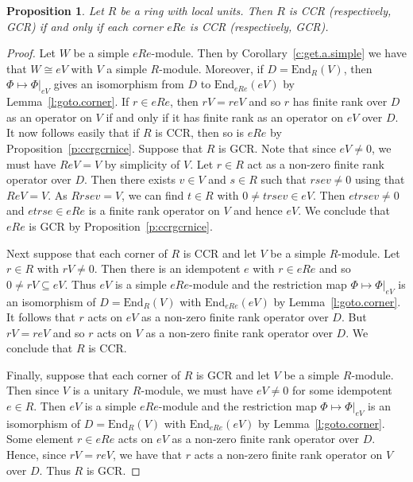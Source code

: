 \documentclass[11pt,reqno]{amsart}
\theoremstyle{plain}
\newtheorem{prop}[thm]{Proposition}
\numberwithin{equation}{section}
\begin{document}
\begin{prop}\label{p:corner.inv}
Let $R$ be a ring with local units.  Then $R$ is CCR (respectively, GCR) if and only if each corner $eRe$ is CCR (respectively, GCR).
\end{prop}
\begin{proof}
Let  $W$ be a simple $eRe$-module.  Then by Corollary~\ref{c:get.a.simple} we have that $W\cong eV$ with $V$ a simple $R$-module.  Moreover, if $D=\mathrm{End}_R(V)$, then $\Phi\mapsto \Phi|_{eV}$ gives an isomorphism from $D$ to $\mathrm{End}_{eRe}(eV)$ by Lemma~\ref{l:goto.corner}.  If $r\in eRe$, then $rV = reV$ and so $r$ has finite rank over $D$ as an operator on $V$ if and only if it has finite rank as an operator on $eV$ over $D$.  It now follows easily that if $R$ is CCR, then so is $eRe$ by Proposition~\ref{p:ccrgcrnice}.  Suppose that $R$ is GCR. Note that since $eV\neq 0$, we must have $ReV=V$ by simplicity of $V$.  Let $r\in R$ act as a non-zero finite rank operator over $D$.  Then there exists $v\in V$ and $s\in R$ such that $rsev\neq 0$ using that $ReV=V$.  As $Rrsev=V$, we can find $t\in R$ with $0\neq trsev\in eV$.  Then $etrsev\neq 0$ and $etrse\in eRe$ is a finite rank operator on $V$ and hence $eV$.  We conclude that $eRe$ is GCR by Proposition~\ref{p:ccrgcrnice}.

Next suppose that each corner of $R$ is CCR and let $V$ be a simple $R$-module.  Let $r\in R$ with $rV\neq 0$.  Then there is an idempotent $e$ with $r\in eRe$ and so $0\neq rV\subseteq eV$.  Thus $eV$ is a simple $eRe$-module and the restriction map $\Phi\mapsto \Phi|_{eV}$ is an isomorphism of $D=\mathrm{End}_R(V)$ with $\mathrm{End}_{eRe}(eV)$ by Lemma~\ref{l:goto.corner}.  It follows that $r$ acts on $eV$ as a non-zero finite rank operator over $D$.  But $rV=reV$ and so $r$ acts on $V$ as a non-zero finite rank operator over $D$.  We conclude that $R$ is CCR.

Finally, suppose that each corner of $R$ is GCR and let $V$ be a simple $R$-module. Then since $V$ is a unitary $R$-module, we must have $eV\neq 0$ for some idempotent $e\in R$.  Then $eV$ is a simple $eRe$-module and the restriction map $\Phi\mapsto \Phi|_{eV}$ is an isomorphism of $D=\mathrm{End}_R(V)$ with $\mathrm{End}_{eRe}(eV)$ by Lemma~\ref{l:goto.corner}.  Some element $r\in eRe$ acts on $eV$ as a non-zero finite rank operator over $D$.  Hence, since $rV=reV$, we have that $r$ acts a non-zero finite rank operator on $V$ over $D$.  Thus $R$ is GCR.
\end{proof}
\end{document}
